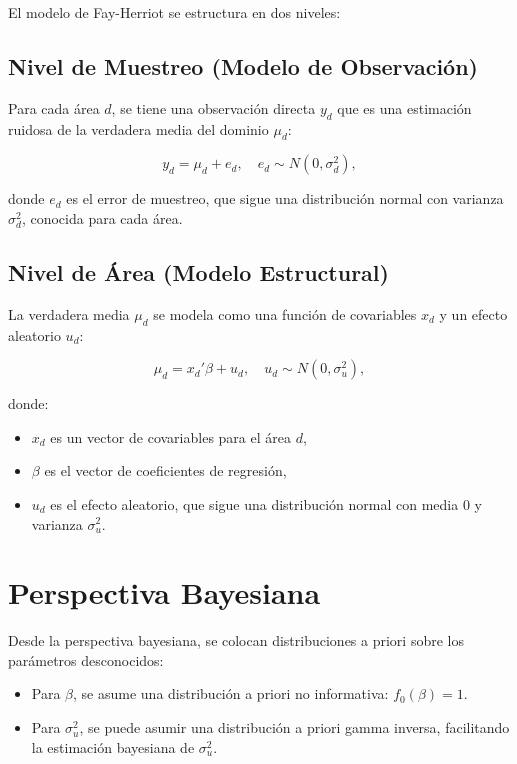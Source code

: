 \documentclass[12pt,spanish]{article}
\begin{document}
El modelo de Fay-Herriot se estructura en dos niveles:

\subsection*{Nivel de Muestreo (Modelo de Observación)}

Para cada área \( d \), se tiene una observación directa \( y_d \) que es una estimación ruidosa de la verdadera media del dominio \( \mu_d \):

\begin{equation*}
    y_d = \mu_d + e_d, \quad e_d \sim N(0, \sigma^2_d),
\end{equation*}

donde \( e_d \) es el error de muestreo, que sigue una distribución normal con varianza \( \sigma^2_d \), conocida para cada área.

\subsection*{Nivel de Área (Modelo Estructural)}

La verdadera media \( \mu_d \) se modela como una función de covariables \( x_d \) y un efecto aleatorio \( u_d \):

\begin{equation*}
    \mu_d = x_d' \beta + u_d, \quad u_d \sim N(0, \sigma^2_u),
\end{equation*}

donde:
\begin{itemize}
    \item \( x_d \) es un vector de covariables para el área \( d \),
    \item \( \beta \) es el vector de coeficientes de regresión,
    \item \( u_d \) es el efecto aleatorio, que sigue una distribución normal con media 0 y varianza \( \sigma^2_u \).
\end{itemize}

\section*{Perspectiva Bayesiana}

Desde la perspectiva bayesiana, se colocan distribuciones a priori sobre los parámetros desconocidos:

\begin{itemize}
    \item Para \( \beta \), se asume una distribución a priori no informativa: \( f_0(\beta) = 1 \).
    \item Para \( \sigma^2_u \), se puede asumir una distribución a priori gamma inversa, facilitando la estimación bayesiana de \( \sigma^2_u \).
\end{itemize}
\end{document}
